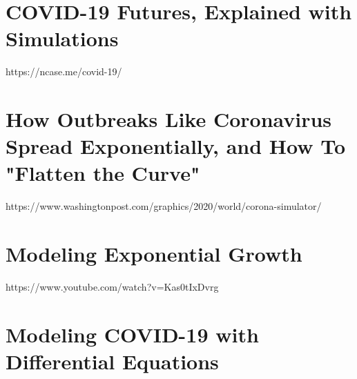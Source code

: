 \documentclass{amsart}
\theoremstyle{definition}
\numberwithin{equation}{section}
\begin{document}
\begin{sansmath}
\section{COVID-19 Futures, Explained with Simulations}
https://ncase.me/covid-19/\\
\lipsum[3-5]

\section{How Outbreaks Like Coronavirus Spread Exponentially, and How To "Flatten the Curve"}
https://www.washingtonpost.com/graphics/2020/world/corona-simulator/\\
\lipsum[1-3]

\section{Modeling Exponential Growth}
https://www.youtube.com/watch?v=Kas0tIxDvrg\\
\lipsum[2-3]

\section{Modeling COVID-19 with Differential Equations}
\lipsum[3-4]
\end{sansmath}
\end{document}
